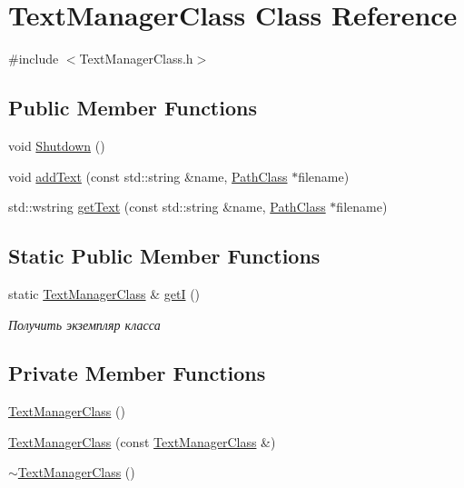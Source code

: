 \hypertarget{class_text_manager_class}{}\section{Text\+Manager\+Class Class Reference}
\label{class_text_manager_class}


{\ttfamily \#include $<$Text\+Manager\+Class.\+h$>$}

\subsection*{Public Member Functions}
\begin{DoxyCompactItemize}
\item 
void \hyperlink{class_text_manager_class_afdb4351e9c992b642d561fb56650051a}{Shutdown} ()
\item 
void \hyperlink{class_text_manager_class_a6cb86cec01e6f6f55f858f89a59a6013}{add\+Text} (const std\+::string \&name, \hyperlink{class_path_class}{Path\+Class} $\ast$filename)
\item 
std\+::wstring \hyperlink{class_text_manager_class_aa1f3a36e412b809ae00f9d93208352b8}{get\+Text} (const std\+::string \&name, \hyperlink{class_path_class}{Path\+Class} $\ast$filename)
\end{DoxyCompactItemize}
\subsection*{Static Public Member Functions}
\begin{DoxyCompactItemize}
\item 
static \hyperlink{class_text_manager_class}{Text\+Manager\+Class} \& \hyperlink{class_text_manager_class_acdec221b6a024b6301780a4cabfef808}{getI} ()
\begin{DoxyCompactList}\small\item\em Получить экземпляр класса \end{DoxyCompactList}\end{DoxyCompactItemize}
\subsection*{Private Member Functions}
\begin{DoxyCompactItemize}
\item 
\hyperlink{class_text_manager_class_af52c850fea9fac64799692df3279cd6e}{Text\+Manager\+Class} ()
\item 
\hyperlink{class_text_manager_class_aae7c1921ed6d21e2127a3088beb30e7c}{Text\+Manager\+Class} (const \hyperlink{class_text_manager_class}{Text\+Manager\+Class} \&)
\item 
\hyperlink{class_text_manager_class_a5ebf3b4827bfbcc4689f5b9f4bebf440}{$\sim$\+Text\+Manager\+Class} ()
\end{DoxyCompactItemize}
